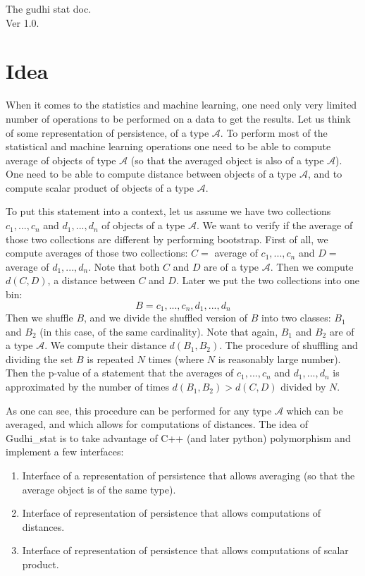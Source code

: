 \documentclass[11pt]{article}
\begin{document}
\begin{center}
\Huge{The gudhi stat doc.\\
Ver 1.0.}
\end{center}


\section{Idea}

When it comes to the statistics and machine learning, one need only very limited number of operations to be performed on a data to get the results. Let us think of some representation of persistence, of a type $\mathcal{A}$. To perform most of the statistical and machine learning operations one need to be able to compute average of objects of type $\mathcal{A}$ (so that the averaged object is also of a type $\mathcal{A}$). One need to be able to compute distance between objects of a type $\mathcal{A}$, and to compute scalar product of objects of a type $\mathcal{A}$.

To put this statement into a context, let us assume we have two collections $c_1,...,c_n$ and $d_1,...,d_n$ of objects of a type $\mathcal{A}$. We want to verify if the average of those two collections are different by performing bootstrap.
First of all, we compute averages of those two collections: $C =$ average of $c_1,...,c_n$ and $D =$ average of $d_1,...,d_n$. Note that both $C$ and $D$ are of a type $\mathcal{A}$. Then we compute $d(C,D)$, a distance between $C$ and $D$.
Later we put the two collections into one bin:\\
\[B = { c_1,...,c_n,d_1,...,d_n }\]
Then we shuffle $B$, and we divide the shuffled version of $B$ into two classes: $B_1$ and $B_2$ (in this case, of the same cardinality). Note that again, $B_1$ and $B_2$ are of a type $\mathcal{A}$. We compute their distance $d(B_1,B_2)$. The procedure of shuffling and dividing the set $B$ is repeated $N$ times (where $N$ is reasonably large number).
Then the p-value of a statement that the averages of  $c_1,...,c_n$ and $d_1,...,d_n$ is approximated by the number of times $d(B_1,B_2) > d(C,D)$ divided by $N$.

As one can see, this procedure can be performed for any type $\mathcal{A}$ which can be averaged, and which allows for computations of distances. The idea of Gudhi\_stat is to take advantage of C++ (and later python) polymorphism and implement a few interfaces:
\begin{enumerate}
\item Interface of a representation of persistence that allows averaging (so that the average object is of the same type).
\item Interface of representation of persistence that allows computations of distances.
\item Interface of representation of persistence that allows computations of scalar product.
\end{enumerate}
\end{document}
